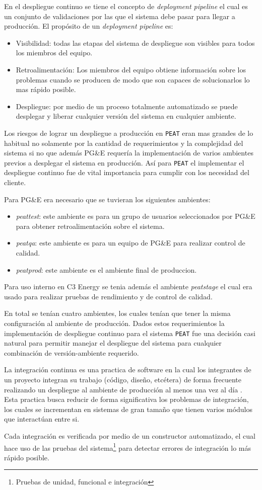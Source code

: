En el despliegue continuo se tiene el concepto de \textit{deployment pipeline}
el cual es un conjunto de validaciones por las que el sistema debe pasar para
llegar a producción. El propósito de un \textit{deployment pipeline} es:
\begin{itemize}
\item Visibilidad: todas las etapas del sistema de despliegue son visibles
  para todos los miembros del equipo.
\item Retroalimentación: Los miembros del equipo obtiene información sobre los
  problemas cuando se producen de modo que son capaces de solucionarlos lo mas
  rápido posible.
\item Despliegue: por medio de un proceso totalmente automatizado se puede
  desplegar y liberar cualquier versión del sistema en cualquier ambiente.
\end{itemize}

Los riesgos de lograr un despliegue a producción en \texttt{PEAT} eran mas grandes
de lo habitual no solamente por la cantidad de requerimientos y la complejidad
del sistema si no que además PG\&E requería la implementación de varios ambientes
previos a desplegar el sistema en producción. Así para \texttt{PEAT} el implementar
el despliegue continuo fue de vital importancia para cumplir con los necesidad
del cliente.

Para PG\&E era necesario que se tuvieran los siguientes ambientes:
\begin{itemize}
\item \textit{peattest}: este ambiente es para un grupo de usuarios seleccionados
  por PG\&E para obtener retroalimentación sobre el sistema.
\item \textit{peatqa}: este ambiente es para un equipo de PG\&E para realizar
  control de calidad.
\item \textit{peatprod}: este ambiente es el ambiente final de produccion.
\end{itemize}

Para uso interno en C3 Energy se tenia además el ambiente \textit{peatstage}
el cual era usado para realizar pruebas de rendimiento y de control de calidad.

En total se tenían cuatro ambientes, los cuales tenían que tener la misma
configuración al ambiente de producción. Dados estos requerimientos la implementación
de despliegue continuo para el sistema \texttt{PEAT} fue una decisión
casi natural para permitir manejar el despliegue del sistema para cualquier
combinación de versión-ambiente requerido.


La integración continua es una practica de software en la cual los integrantes
de un proyecto integran su trabajo (código, diseño, etcétera) de forma frecuente
realizando un despliegue al ambiente de producción al menos una vez al día
\cite{26_martin_fowler_ci}. Esta practica busca reducir de forma significativa los
problemas de integración, los cuales se incrementan en sistemas de gran tamaño
que tienen varios módulos que interactúan entre si.

Cada integración es verificada por medio de un constructor automatizado, el cual
hace uso de las pruebas del sistema\footnote{Pruebas de unidad, funcional e
  integración} para detectar errores de integración lo más rápido posible.
